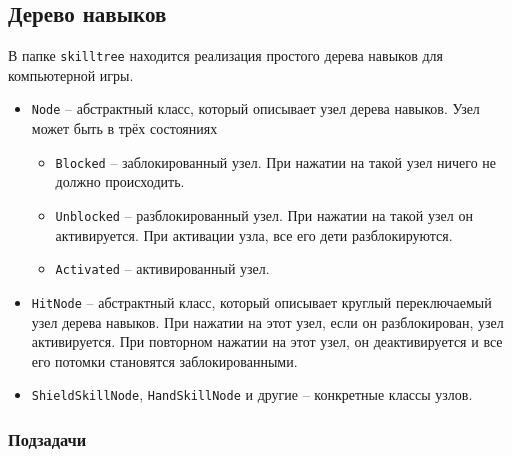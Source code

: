 \documentclass{article}
\begin{document}
\subsection{Дерево навыков}
В папке \texttt{skilltree} находится реализация простого дерева навыков для компьютерной игры.
\begin{itemize}
\item \texttt{Node} -- абстрактный класс, который описывает узел дерева навыков. Узел может быть в трёх состояниях
\begin{itemize}
\item \texttt{Blocked} -- заблокированный узел. При нажатии на такой узел ничего не должно происходить.
\item \texttt{Unblocked} -- разблокированный узел. При нажатии на такой узел он активируется. При активации узла, все его дети разблокируются.
\item \texttt{Activated} -- активированный узел.
\end{itemize}
\item \texttt{HitNode} -- абстрактный класс, который описывает круглый переключаемый узел дерева навыков. При нажатии на этот узел, если он разблокирован, узел активируется. При повторном нажатии на этот узел, он деактивируется и все его потомки становятся заблокированными.

\item \texttt{ShieldSkillNode}, \texttt{HandSkillNode} и другие -- конкретные классы узлов.
\end{itemize}



\subsubsection*{Подзадачи}
\end{document}
